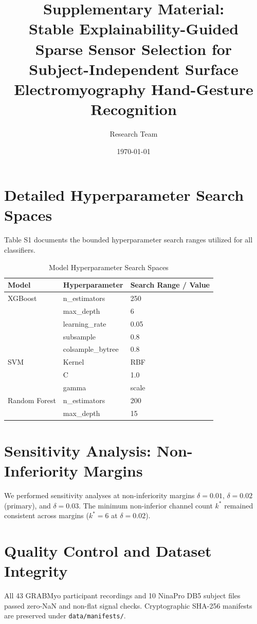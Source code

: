 \documentclass[10pt,onecolumn,letterpaper]{article}
\title{\textbf{Supplementary Material:\\Stable Explainability-Guided Sparse Sensor Selection for Subject-Independent Surface Electromyography Hand-Gesture Recognition}}
\author{Research Team}
\date{\today}
\begin{document}
\maketitle

\tableofcontents
\newpage

\section{Detailed Hyperparameter Search Spaces}
Table S1 documents the bounded hyperparameter search ranges utilized for all classifiers.

\begin{table}[h!]
\centering
\caption{Model Hyperparameter Search Spaces}
\begin{tabular}{lll}
\toprule
Model & Hyperparameter & Search Range / Value \\
\midrule
XGBoost & n\_estimators & 250 \\
        & max\_depth & 6 \\
        & learning\_rate & 0.05 \\
        & subsample & 0.8 \\
        & colsample\_bytree & 0.8 \\
SVM     & Kernel & RBF \\
        & C & 1.0 \\
        & gamma & scale \\
Random Forest & n\_estimators & 200 \\
              & max\_depth & 15 \\
\bottomrule
\end{tabular}
\end{table}

\section{Sensitivity Analysis: Non-Inferiority Margins}
We performed sensitivity analyses at non-inferiority margins $\delta = 0.01$, $\delta = 0.02$ (primary), and $\delta = 0.03$. The minimum non-inferior channel count $k^*$ remained consistent across margins ($k^*=6$ at $\delta=0.02$).

\section{Quality Control and Dataset Integrity}
All 43 GRABMyo participant recordings and 10 NinaPro DB5 subject files passed zero-NaN and non-flat signal checks. Cryptographic SHA-256 manifests are preserved under \texttt{data/manifests/}.
\end{document}

